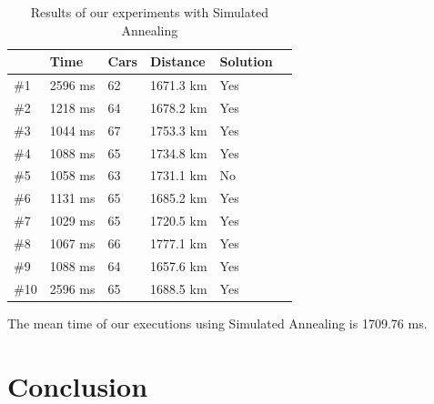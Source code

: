 \documentclass[12]{article}
\begin{document}
\begin{table}[H]
\centering
\begin{tabular}{|l|l|l|l|l|l|}
\hline & \textbf{Time}  & \textbf{Cars} & \textbf{Distance} & \textbf{Solution}\\  \hline
 \#1 & 2596 ms  & 62 & 1671.3 km & Yes \\ \hline
 \#2 & 1218 ms & 64 & 1678.2 km & Yes \\ \hline
  \#3 & 1044 ms & 67 & 1753.3 km & Yes \\ \hline
 \#4 & 1088 ms & 65 & 1734.8 km & Yes \\ \hline
 \#5 & 1058 ms & 63 & 1731.1 km & No \\ \hline
 \#6 & 1131 ms & 65 & 1685.2 km & Yes \\ \hline
 \#7 & 1029 ms & 65 & 1720.5 km & Yes \\ \hline
 \#8 & 1067 ms & 66 & 1777.1 km & Yes \\ \hline
 \#9 & 1088 ms & 64 & 1657.6 km & Yes\\ \hline
 \#10 & 2596 ms & 65 & 1688.5 km & Yes \\ \hline

\end{tabular}
\caption{Results of our experiments with Simulated Annealing}
\label{Results2}
\end{table}

The mean time of our executions using Simulated Annealing is 1709.76 ms. 

\section{Conclusion}
\end{document}
